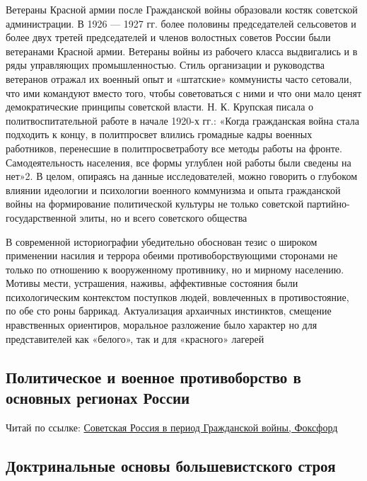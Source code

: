 \documentclass{article}
\begin{document}
\hfill

Ветераны Красной армии после Гражданской войны образовали костяк советской администрации. В 1926 — 1927 гг. более половины председателей сельсоветов и более двух третей председателей и членов волостных советов России были ветеранами Красной армии. Ветераны войны из рабочего класса выдвигались и в ряды управляющих промышленностью. Стиль организации и руководства ветеранов отражал их военный опыт и «штатские» коммунисты часто сетовали, что ими командуют вместо того, чтобы советоваться с ними и что они мало ценят демократические принципы советской власти. Н. К. Крупская писала о политвоспитательной работе в начале 1920-х гг.: «Когда гражданская война стала подходить к концу, в политпросвет влились громадные кадры военных работников, перенесшие в политпросветработу все методы работы на фронте. Самодеятельность населения, все формы углублен ной работы были сведены на нет»2. В целом, опираясь на данные исследователей, можно говорить о глубоком влиянии идеологии и психологии военного коммунизма и опыта гражданской войны на формирование политической культуры не только советской партийно-государственной элиты, но и всего советского общества

\hfill

В современной историографии убедительно обоснован тезис о широком применении насилия и террора обеими противоборствующими сторонами не только по отношению к вооруженному противнику, но и мирному населению. Мотивы мести, устрашения, наживы, аффективные состояния были психологическим контекстом поступков людей, вовлеченных в противостояние, по обе сто роны баррикад. Актуализация архаичных инстинктов, смещение нравственных ориентиров, моральное разложение было характер но для представителей как «белого», так и для «красного» лагерей

\pagebreak
\subsection{Политическое и военное противоборство в основных регионах России}

Читай по ссылке: \href{https://foxford.ru/wiki/istoriya/sovetskaya-rossiya-v-period-grazhdanskoy-voyny}{Советская Россия в период Гражданской войны, Фоксфорд}

\pagebreak
\subsection{Доктринальные основы большевистского строя}
\end{document}
